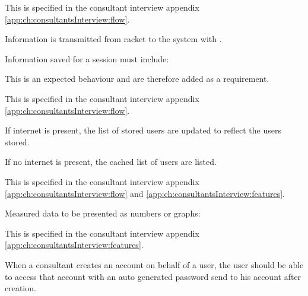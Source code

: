 
This  is specified in the consultant interview appendix \ref{app:ch:consultantsInterview:flow}.

Information is transmitted from racket to the system with .

Information saved for a session must include: \newline
{}


This is an expected behaviour and are therefore added as a requirement.


This  is specified in the consultant interview appendix \ref{app:ch:consultantsInterview:flow}.

If internet is present, the list of stored users are updated to reflect the users stored.

If no internet is present, the cached list of users are listed.


This  is specified in the consultant interview appendix \ref{app:ch:consultantsInterview:flow} and \ref{app:ch:consultantsInterview:features}.

Measured data to be presented as numbers or graphs: \newline
{}


This  is specified in the consultant interview appendix \ref{app:ch:consultantsInterview:features}.

When a consultant creates an account on behalf of a user, the user should be able to access that account with an auto generated password send to his account after creation.

